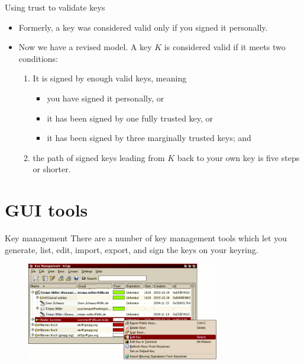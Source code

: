 \documentclass[%
mode=present,%
paper=smartboard,
size=20pt,
]{powerdot}
\begin{document}
\begin{slide}{Using trust to validate keys}
  \begin{itemize}
  \item Formerly, a key was considered valid only if you signed it
    personally.
  \item Now we have a revised model.  A key $K$ is considered valid if
    it meets two conditions:
    \begin{enumerate}
    \item It is signed by enough valid keys, meaning
      \begin{itemize}
      \item you have signed it personally, or
      \item it has been signed by one fully trusted key, or
      \item it has been signed by three marginally trusted keys; and
      \end{itemize}
    \item the path of signed keys leading from $K$ back to your own
      key is five steps or shorter.
    \end{enumerate}
  \end{itemize}
\end{slide}

\section{GUI tools}

\begin{slide}{Key management}
  There are a number of key management tools which let you generate,
  list, edit, import, export, and sign the keys on your keyring.
  \begin{figure}[H]
    \centering
    \includegraphics[width=0.75\textwidth]{kgpg1}
    \label{fig:kgpg1}
  \end{figure}
\end{slide}
\end{document}
